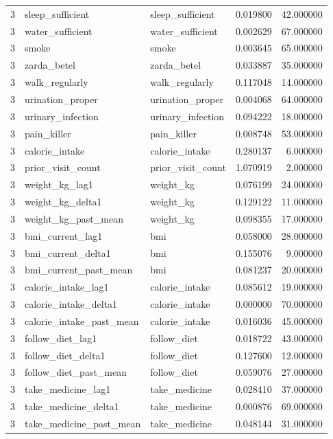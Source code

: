 \begin{longtable}{rllrr}
3 & sleep\_sufficient & sleep\_sufficient & 0.019800 & 42.000000 \\
3 & water\_sufficient & water\_sufficient & 0.002629 & 67.000000 \\
3 & smoke & smoke & 0.003645 & 65.000000 \\
3 & zarda\_betel & zarda\_betel & 0.033887 & 35.000000 \\
3 & walk\_regularly & walk\_regularly & 0.117048 & 14.000000 \\
3 & urination\_proper & urination\_proper & 0.004068 & 64.000000 \\
3 & urinary\_infection & urinary\_infection & 0.094222 & 18.000000 \\
3 & pain\_killer & pain\_killer & 0.008748 & 53.000000 \\
3 & calorie\_intake & calorie\_intake & 0.280137 & 6.000000 \\
3 & prior\_visit\_count & prior\_visit\_count & 1.070919 & 2.000000 \\
3 & weight\_kg\_lag1 & weight\_kg & 0.076199 & 24.000000 \\
3 & weight\_kg\_delta1 & weight\_kg & 0.129122 & 11.000000 \\
3 & weight\_kg\_past\_mean & weight\_kg & 0.098355 & 17.000000 \\
3 & bmi\_current\_lag1 & bmi & 0.058000 & 28.000000 \\
3 & bmi\_current\_delta1 & bmi & 0.155076 & 9.000000 \\
3 & bmi\_current\_past\_mean & bmi & 0.081237 & 20.000000 \\
3 & calorie\_intake\_lag1 & calorie\_intake & 0.085612 & 19.000000 \\
3 & calorie\_intake\_delta1 & calorie\_intake & 0.000000 & 70.000000 \\
3 & calorie\_intake\_past\_mean & calorie\_intake & 0.016036 & 45.000000 \\
3 & follow\_diet\_lag1 & follow\_diet & 0.018722 & 43.000000 \\
3 & follow\_diet\_delta1 & follow\_diet & 0.127600 & 12.000000 \\
3 & follow\_diet\_past\_mean & follow\_diet & 0.059076 & 27.000000 \\
3 & take\_medicine\_lag1 & take\_medicine & 0.028410 & 37.000000 \\
3 & take\_medicine\_delta1 & take\_medicine & 0.000876 & 69.000000 \\
3 & take\_medicine\_past\_mean & take\_medicine & 0.048144 & 31.000000 \\

\end{longtable}
